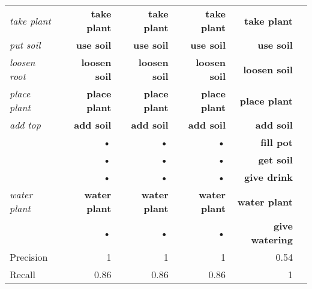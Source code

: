 \documentclass[10pt,twocolumn,letterpaper]{article}
\begin{document}
\begin{table*}
\begin{subtable}{0.48\textwidth}
{\begin{tabular}{lrrrr >{\centering\hspace{0.5pt}}m{0cm}}
\textit{take plant}   & \textbf{take plant}&  \textbf{take plant}  & \textbf{take plant}  & \textbf{take plant}  \\ 
\textit{put soil}     & \textbf{use soil}& \textbf{use soil}&\textbf{use soil}&\textbf{use soil}\\
\textit{loosen root}  & \textbf{loosen soil}&  \textbf{loosen soil}&\textbf{loosen soil}&\textbf{loosen soil}\\
\textit{place plant}  & \textbf{place plant}&   \textbf{place plant}&  \textbf{place plant}&  \textbf{place plant}\\
\textit{add top}      & \textbf{add soil}& \textbf{add soil}& \textbf{add soil}& \textbf{add soil}\\
& \textbf{•}&  \textbf{•}   & \textbf{•}  & \textbf{fill pot}   \\
& \textbf{•}&  \textbf{•}   & \textbf{•}  & \textbf{get soil}   \\ 
& \textbf{•}&  \textbf{•}   & \textbf{•}  & \textbf{give drink}   \\ 
\textit{water plant}  & \textbf{water plant}&  \textbf{water plant}&\textbf{water plant}&\textbf{water plant}\\
& \textbf{•}&  \textbf{•}   & \textbf{•}  & \textbf{give watering}   \\ 
\midrule
Precision  & 1    &  1      & 1    &  0.54  \\
Recall     & 0.86 &  0.86   & 0.86 &  1 \\


\end{tabular}}
\end{subtable}
\end{table*}
\end{document}
